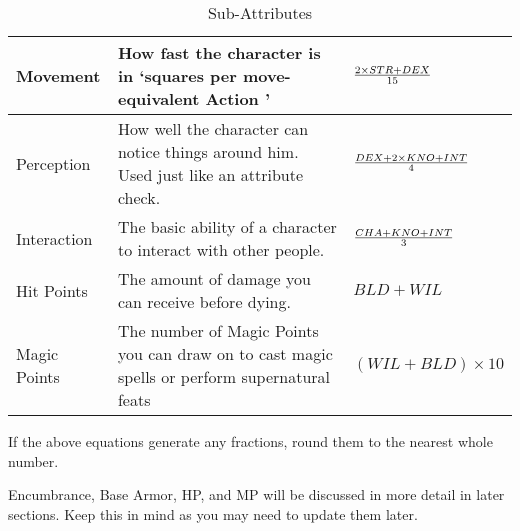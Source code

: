 \documentclass[twoside]{book}
\begin{document}
\begin{table}[!htb]
\begin{center}
\begin{tabular}{|p{1in}|p{3in}|p{1.5in}|}
\hline Movement & How fast the character is in `squares
                     per move-equivalent Action ' &  \begin{math}  {{ 2  \times 
                     STR + DEX}\over{ 15 }}  \end{math}
                  \\

\hline Perception & How well the character can notice things
                     around him. Used just like an attribute check.
                     &  \begin{math}  {{  DEX +
                        2  \times    KNO
                     +   INT  }\over{ 4
                     }}  \end{math}
                  \\

\hline Interaction & The basic ability of a character to interact
                     with other people. &  \begin{math}  {{CHA +
                     KNO + INT}\over{ 3 }}  \end{math}
                  \\

\hline Hit Points & The amount of damage you can receive before
                     dying. &  \begin{math}BLD + WIL
                    \end{math}
                  \\

\hline Magic Points & The number of Magic Points you can draw on to
                     cast magic spells or perform supernatural feats
                     &  \begin{math}     (   WIL 
                      +   BLD   )   
                     \times     10     \end{math}
                  \\

\hline
  \end{tabular}
  
\caption{Sub-Attributes}
  
  \end{center}
\end{table}
  
    {  
    If the above equations generate any fractions, round
               them to the nearest whole number. 
    }
  
    {  
    Encumbrance, Base Armor, HP, and MP will be
               discussed in more detail in later sections. Keep this in
               mind as you may need to update them later. 
    }
  
\end{document}

